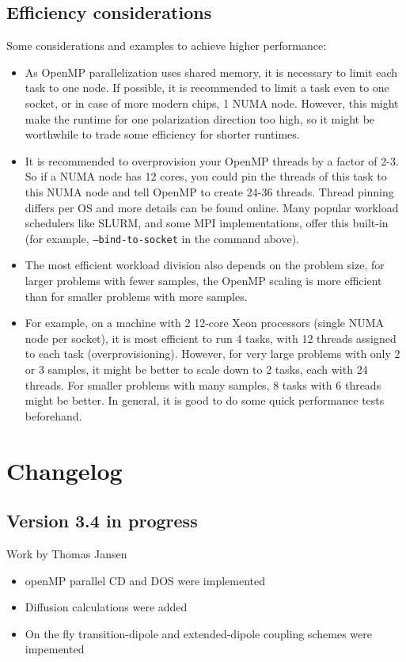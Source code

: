 \documentclass[12pt]{book}
\begin{document}
\subsection{Efficiency considerations}
Some considerations and examples to achieve higher performance:
\begin{itemize}
\item As OpenMP parallelization uses shared memory, it is necessary to limit each task to one node. If possible, it is recommended to limit a task even to one socket, or in case of more modern chips, 1 NUMA node. However, this might make the runtime for one polarization direction too high, so it might be worthwhile to trade some efficiency for shorter runtimes.
\item It is recommended to overprovision your OpenMP threads by a factor of 2-3. So if a NUMA node has 12 cores, you could pin the threads of this task to this NUMA node and tell OpenMP to create 24-36 threads. Thread pinning differs per OS and more details can be found online. Many popular workload schedulers like SLURM, and some MPI implementations, offer this built-in (for example, {\tt --bind-to-socket} in the command above).
\item The most efficient workload division also depends on the problem size, for larger problems with fewer samples, the OpenMP scaling is more efficient than for smaller problems with more samples.
\item For example, on a machine with 2 12-core Xeon processors (single NUMA node per socket), it is most efficient to run 4 tasks, with 12 threads assigned to each task (overprovisioning). However, for very large problems with only 2 or 3 samples, it might be better to scale down to 2 tasks, each with 24 threads. For smaller problems with many samples, 8 tasks with 6 threads might be better. In general, it is good to do some quick performance tests beforehand.
\end{itemize}

\section{Changelog}
\subsection{Version 3.4 in progress}
{\small Work by Thomas Jansen}
\begin{itemize}
\item openMP parallel CD and DOS were implemented
\item Diffusion calculations were added
\item On the fly transition-dipole and extended-dipole coupling schemes were impemented
\end{itemize}
\end{document}
